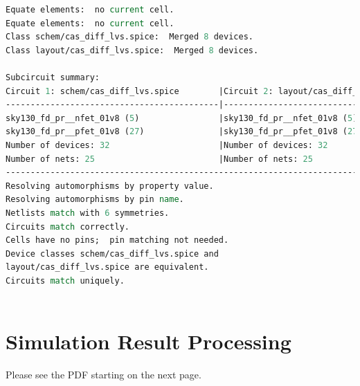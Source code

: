 \documentclass[11pt]{article}
\begin{document}
    \begin{lstlisting}[language=tcl, caption=\textbf{Layout versus Schematic for Cascode Differential Amplifier}]
Equate elements:  no current cell.
Equate elements:  no current cell.
Class schem/cas_diff_lvs.spice:  Merged 8 devices.
Class layout/cas_diff_lvs.spice:  Merged 8 devices.

Subcircuit summary:
Circuit 1: schem/cas_diff_lvs.spice        |Circuit 2: layout/cas_diff_lvs.spice       
-------------------------------------------|-------------------------------------------
sky130_fd_pr__nfet_01v8 (5)                |sky130_fd_pr__nfet_01v8 (5)                
sky130_fd_pr__pfet_01v8 (27)               |sky130_fd_pr__pfet_01v8 (27)               
Number of devices: 32                      |Number of devices: 32                      
Number of nets: 25                         |Number of nets: 25                         
---------------------------------------------------------------------------------------
Resolving automorphisms by property value.
Resolving automorphisms by pin name.
Netlists match with 6 symmetries.
Circuits match correctly.
Cells have no pins;  pin matching not needed.
Device classes schem/cas_diff_lvs.spice and
layout/cas_diff_lvs.spice are equivalent.
Circuits match uniquely.
        

    \end{lstlisting}
    \section{Simulation Result Processing}\label{sec:res}
    Please see the PDF starting on the next page.
    
\end{document}
